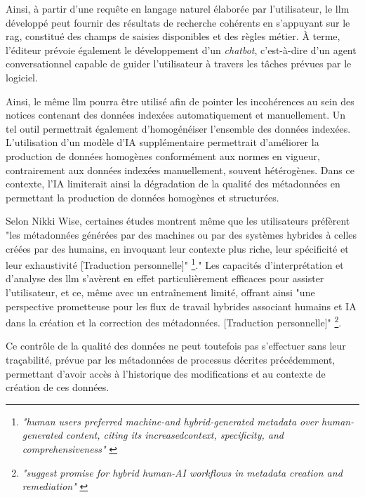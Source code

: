 Ainsi, à partir d'une requête en langage naturel élaborée par l'utilisateur, le \gls{llm} développé peut fournir des résultats de recherche cohérents en s'appuyant sur le \gls{rag}, constitué des champs de saisies disponibles et des règles métier. À terme, l'éditeur prévoie également le développement d'un \textit{chatbot}, c'est-à-dire d'un agent conversationnel capable de guider l'utilisateur à travers les tâches prévues par le logiciel.

Ainsi, le même \gls{llm} pourra être utilisé afin de pointer les incohérences au sein des notices contenant des données indexées automatiquement et manuellement. Un tel outil permettrait également d'homogénéiser l'ensemble des données indexées. L'utilisation d'un modèle d'IA supplémentaire permettrait d'améliorer la production de données homogènes conformément aux normes en vigueur, contrairement aux données indexées manuellement, souvent hétérogènes. Dans ce contexte, l'IA limiterait ainsi la dégradation de la qualité des métadonnées en permettant la production de données homogènes et structurées. 

Selon Nikki Wise, certaines études montrent même que les utilisateurs préfèrent "les métadonnées générées par des machines ou par des systèmes hybrides à celles créées par des humains, en invoquant leur contexte plus riche, leur spécificité et leur exhaustivité [Traduction personnelle]" \footnote{\textit{"human users preferred machine-and hybrid-generated metadata over human-generated content, citing its increasedcontext, specificity, and comprehensiveness"} \cite{wise2026}}." Les capacités d'interprétation et d'analyse des \gls{llm} s'avèrent en effet particulièrement efficaces pour assister l'utilisateur, et ce, même avec un entraînement limité, offrant ainsi "une perspective prometteuse pour les flux de travail hybrides associant humains et IA dans la création et la correction des métadonnées. [Traduction personnelle]" \footnote{\textit{"suggest promise for hybrid human-AI workflows in metadata creation and remediation"} \cite{wise2026}}.

Ce contrôle de la qualité des données ne peut toutefois pas s'effectuer sans leur traçabilité, prévue par les métadonnées de processus décrites précédemment, permettant d'avoir accès à l'historique des modifications et au contexte de création de ces données.

